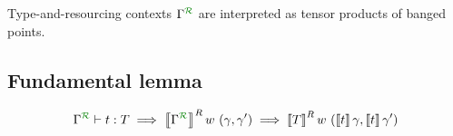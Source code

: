 Type-and-resourcing contexts $\ctx{\Gamma}{R}$ are interpreted as
tensor products of banged points.


\subsection{Fundamental lemma}

\begin{displaymath}
  \ctx{\Gamma}{R} \vdash t : T \implies \sem{\ctx{\Gamma}{R}}^R w~(\gamma, \gamma') \implies \sem{T}^R w~(\sem{t}\gamma, \sem{t}\gamma')
\end{displaymath}
